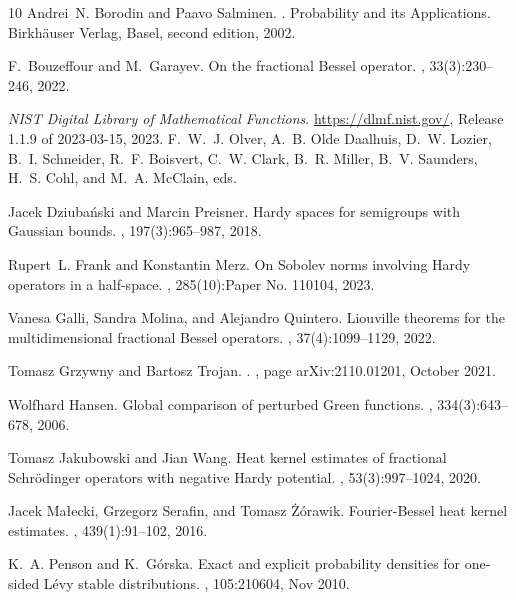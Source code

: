 \documentclass[12pt,reqno,a4paper]{amsart}
\theoremstyle{definition}
\theoremstyle{remark}
\numberwithin{equation}{section}
\newcommand{\1}{\mathbbm{1}}
\begin{document}
\begin{thebibliography}{10}
Andrei~N. Borodin and Paavo Salminen.
.
\newblock Probability and its Applications. Birkh\"{a}user Verlag, Basel,
  second edition, 2002.

F.~Bouzeffour and M.~Garayev.
\newblock On the fractional {B}essel operator.
, 33(3):230--246, 2022.

{\it NIST Digital Library of Mathematical Functions}.
\newblock \url{https://dlmf.nist.gov/}, Release 1.1.9 of 2023-03-15, 2023.
\newblock F.~W.~J. Olver, A.~B. {Olde Daalhuis}, D.~W. Lozier, B.~I. Schneider,
  R.~F. Boisvert, C.~W. Clark, B.~R. Miller, B.~V. Saunders, H.~S. Cohl, and
  M.~A. McClain, eds.

Jacek Dziuba\'{n}ski and Marcin Preisner.
\newblock Hardy spaces for semigroups with {G}aussian bounds.
, 197(3):965--987, 2018.

Rupert~L. Frank and Konstantin Merz.
\newblock On {S}obolev norms involving {H}ardy operators in a half-space.
, 285(10):Paper No. 110104, 2023.

Vanesa Galli, Sandra Molina, and Alejandro Quintero.
\newblock Liouville theorems for the multidimensional fractional {B}essel
  operators.
, 37(4):1099--1129, 2022.

Tomasz {Grzywny} and Bartosz {Trojan}.
.
, page arXiv:2110.01201, October 2021.

Wolfhard Hansen.
\newblock Global comparison of perturbed {G}reen functions.
, 334(3):643--678, 2006.

Tomasz Jakubowski and Jian Wang.
\newblock Heat kernel estimates of fractional {S}chr\"{o}dinger operators with
  negative {H}ardy potential.
, 53(3):997--1024, 2020.

Jacek Ma{\l}ecki, Grzegorz Serafin, and Tomasz {\.Z}{\'o}rawik.
\newblock Fourier-{B}essel heat kernel estimates.
, 439(1):91--102, 2016.

K.~A. Penson and K.~G\'orska.
\newblock Exact and explicit probability densities for one-sided {L}\'evy
  stable distributions.
, 105:210604, Nov 2010.


\end{thebibliography}
\end{document}
